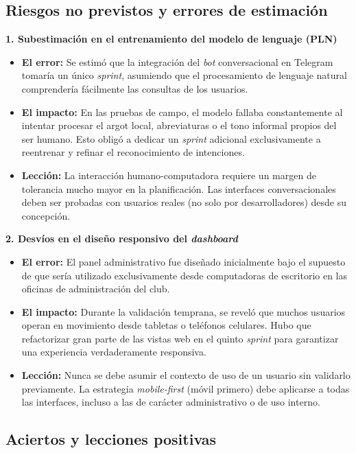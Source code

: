 \subsection{Riesgos no previstos y errores de estimación}

\textbf{1. Subestimación en el entrenamiento del modelo de lenguaje (PLN)}
\begin{itemize}
    \item \textbf{El error:} Se estimó que la integración del \textit{bot} conversacional en Telegram tomaría un único \textit{sprint}, asumiendo que el procesamiento de lenguaje natural comprendería fácilmente las consultas de los usuarios.
    \item \textbf{El impacto:} En las pruebas de campo, el modelo fallaba constantemente al intentar procesar el argot local, abreviaturas o el tono informal propios del ser humano. Esto obligó a dedicar un \textit{sprint} adicional exclusivamente a reentrenar y refinar el reconocimiento de intenciones.
    \item \textbf{Lección:} La interacción humano-computadora requiere un margen de tolerancia mucho mayor en la planificación. Las interfaces conversacionales deben ser probadas con usuarios reales (no solo por desarrolladores) desde su concepción.
\end{itemize}

\newpage

\textbf{2. Desvíos en el diseño responsivo del \textit{dashboard}}
\begin{itemize}
    \item \textbf{El error:} El panel administrativo fue diseñado inicialmente bajo el supuesto de que sería utilizado exclusivamente desde computadoras de escritorio en las oficinas de administración del club.
    \item \textbf{El impacto:} Durante la validación temprana, se reveló que muchos usuarios operan en movimiento desde tabletas o teléfonos celulares. Hubo que refactorizar gran parte de las vistas web en el quinto \textit{sprint} para garantizar una experiencia verdaderamente responsiva.
    \item \textbf{Lección:} Nunca se debe asumir el contexto de uso de un usuario sin validarlo previamente. La estrategia \textit{mobile-first} (móvil primero) debe aplicarse a todas las interfaces, incluso a las de carácter administrativo o de uso interno.
\end{itemize}

\subsection{Aciertos y lecciones positivas}

